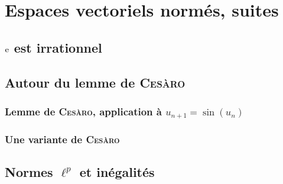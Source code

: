\chapter{Espaces vectoriels normés, suites}

\section{\texorpdfstring{$\mathrm{e}$}{e} est irrationnel}


\section{Autour du lemme de \textsc{Cesàro}}

\subsection{Lemme de \textsc{Cesàro}, application à \texorpdfstring{$u_{n+1}=\sin(u_n)$}{u_n+1 = sin(u_n)}}


\subsection{Une variante de \textsc{Cesàro}}


\section{Normes \texorpdfstring{$\ell^p$}{l^p} et inégalités}



